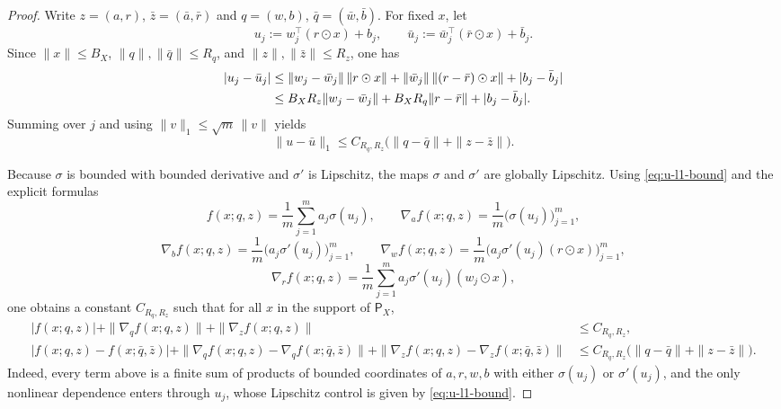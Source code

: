 \documentclass{article}
\theoremstyle{definition}
\begin{document}
\begin{proof}
Write $z=(a,r)$, $\bar z=(\bar a,\bar r)$ and $q=(w,b)$, $\bar q=(\bar w,\bar b)$. For fixed $x$, let
\[
  u_j:=w_j^\top(r\odot x)+b_j,
  \qquad
  \bar u_j:=\bar w_j^\top(\bar r\odot x)+\bar b_j.
\]
Since $\|x\|\le B_X$, $\|q\|,\|\bar q\|\le R_q$, and $\|z\|,\|\bar z\|\le R_z$, one has
\begin{align}
  |u_j-\bar u_j|
  &\le
  \|w_j-\bar w_j\|\,\|r\odot x\|
  +
  \|\bar w_j\|\,\|(r-\bar r)\odot x\|
  +
  |b_j-\bar b_j|
  \notag\\
  &\le
  B_X R_z \|w_j-\bar w_j\|
  +
  B_X R_q \|r-\bar r\|
  +
  |b_j-\bar b_j|.
  \label{eq:u-diff-bound}
\end{align}
Summing over $j$ and using $\|v\|_1\le \sqrt m\,\|v\|$ yields
\begin{equation}
  \|u-\bar u\|_1
  \le
  C_{R_q,R_z}
  \bigl(
    \|q-\bar q\|+\|z-\bar z\|
  \bigr).
  \label{eq:u-l1-bound}
\end{equation}

Because $\sigma$ is bounded with bounded derivative and $\sigma'$ is Lipschitz, the maps $\sigma$ and $\sigma'$ are globally Lipschitz. Using \eqref{eq:u-l1-bound} and the explicit formulas
\[
  f(x;q,z)
  =
  \frac1m\sum_{j=1}^m a_j \sigma(u_j),
  \qquad
  \nabla_a f(x;q,z)
  =
  \frac1m\bigl(\sigma(u_j)\bigr)_{j=1}^m,
\]
\[
  \nabla_b f(x;q,z)
  =
  \frac1m\bigl(a_j\sigma'(u_j)\bigr)_{j=1}^m,
  \qquad
  \nabla_w f(x;q,z)
  =
  \frac1m\bigl(a_j\sigma'(u_j)(r\odot x)\bigr)_{j=1}^m,
\]
\[
  \nabla_r f(x;q,z)
  =
  \frac1m\sum_{j=1}^m a_j \sigma'(u_j)(w_j\odot x),
\]
one obtains a constant $C_{R_q,R_z}$ such that for all $x$ in the support of $\mathsf P_X$,
\begin{align}
  |f(x;q,z)|+
  \|\nabla_q f(x;q,z)\|+
  \|\nabla_z f(x;q,z)\|
  &\le
  C_{R_q,R_z},
  \label{eq:f-grad-local-bdd}
  \\
  |f(x;q,z)-f(x;\bar q,\bar z)|
  +
  \|\nabla_q f(x;q,z)-\nabla_q f(x;\bar q,\bar z)\|
  +
  \|\nabla_z f(x;q,z)-\nabla_z f(x;\bar q,\bar z)\|
  &\le
  C_{R_q,R_z}
  \bigl(
    \|q-\bar q\|+\|z-\bar z\|
  \bigr).
  \label{eq:f-grad-local-lip}
\end{align}
Indeed, every term above is a finite sum of products of bounded coordinates of $a,r,w,b$ with either $\sigma(u_j)$ or $\sigma'(u_j)$, and the only nonlinear dependence enters through $u_j$, whose Lipschitz control is given by \eqref{eq:u-l1-bound}.


\end{proof}
\end{document}
